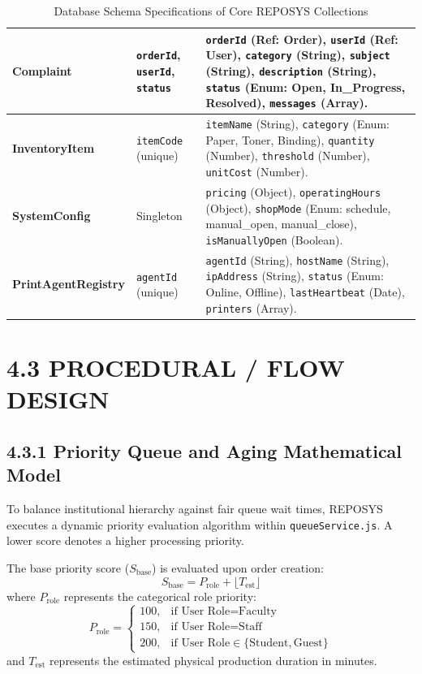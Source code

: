 \documentclass[12pt,a4paper,oneside]{report}
\begin{document}
\begin{table}[H]
\begin{tabularx}{\textwidth}{|p{1.1in}|p{1.1in}|X|}
\textbf{Complaint} & \texttt{orderId}, \texttt{userId}, \texttt{status} & \texttt{orderId} (Ref: Order), \texttt{userId} (Ref: User), \texttt{category} (String), \texttt{subject} (String), \texttt{description} (String), \texttt{status} (Enum: Open, In\_Progress, Resolved), \texttt{messages} (Array). \\ \hline
\textbf{InventoryItem} & \texttt{itemCode} (unique) & \texttt{itemName} (String), \texttt{category} (Enum: Paper, Toner, Binding), \texttt{quantity} (Number), \texttt{threshold} (Number), \texttt{unitCost} (Number). \\ \hline
\textbf{SystemConfig} & Singleton & \texttt{pricing} (Object), \texttt{operatingHours} (Object), \texttt{shopMode} (Enum: schedule, manual\_open, manual\_close), \texttt{isManuallyOpen} (Boolean). \\ \hline
\textbf{PrintAgentRegistry} & \texttt{agentId} (unique) & \texttt{agentId} (String), \texttt{hostName} (String), \texttt{ipAddress} (String), \texttt{status} (Enum: Online, Offline), \texttt{lastHeartbeat} (Date), \texttt{printers} (Array). \\ \hline
\end{tabularx}
\caption{Database Schema Specifications of Core REPOSYS Collections}
\label{tab:schema_specs}
\end{table}

\section{4.3 PROCEDURAL / FLOW DESIGN}

\subsection{4.3.1 Priority Queue and Aging Mathematical Model}
To balance institutional hierarchy against fair queue wait times, REPOSYS executes a dynamic priority evaluation algorithm within \texttt{queueService.js}. A lower score denotes a higher processing priority.

The base priority score ($S_{\text{base}}$) is evaluated upon order creation:
\begin{equation}
S_{\text{base}} = P_{\text{role}} + \lfloor T_{\text{est}} \rfloor
\end{equation}
where $P_{\text{role}}$ represents the categorical role priority:
\begin{equation}
P_{\text{role}} = 
\begin{cases} 
100, & \text{if User Role} = \text{Faculty} \\
150, & \text{if User Role} = \text{Staff} \\
200, & \text{if User Role} \in \{\text{Student}, \text{Guest}\}
\end{cases}
\end{equation}
and $T_{\text{est}}$ represents the estimated physical production duration in minutes.
\end{document}
